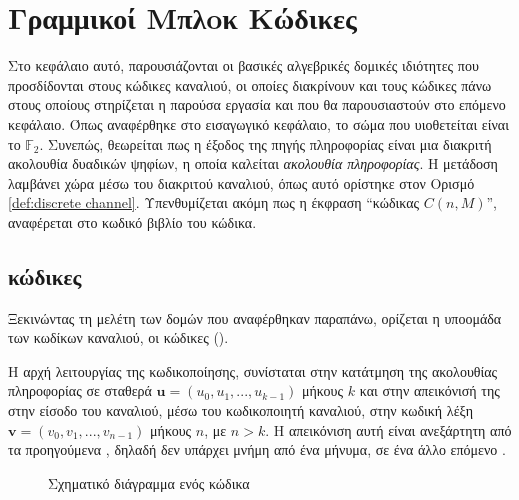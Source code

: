 \chapter{Γραμμικοί Μπλoκ Κώδικες}
Στο κεφάλαιο αυτό, παρουσιάζονται οι βασικές αλγεβρικές δομικές ιδιότητες που προσδίδονται στους κώδικες καναλιού, οι οποίες διακρίνουν και τους κώδικες πάνω στους οποίους στηρίζεται η παρούσα εργασία και που θα παρουσιαστούν στο επόμενο κεφάλαιο. Όπως αναφέρθηκε στο εισαγωγικό κεφάλαιο, το σώμα που υιοθετείται είναι το $\mathbb{F}_2$. Συνεπώς, θεωρείται πως η έξοδος της πηγής πληροφορίας είναι μια διακριτή ακολουθία  δυαδικών ψηφίων, η οποία καλείται \textit{ακολουθία πληροφορίας}. Η μετάδοση λαμβάνει χώρα μέσω του διακριτού καναλιού, όπως αυτό ορίστηκε στον Ορισμό \ref{def:discrete channel}. Υπενθυμίζεται ακόμη πως η έκφραση \enquote{κώδικας $C(n,M)$}, αναφέρεται στο κωδικό βιβλίο του κώδικα.

\section{ κώδικες}
Ξεκινώντας τη μελέτη των δομών που αναφέρθηκαν παραπάνω, ορίζεται η υποομάδα των κωδίκων καναλιού, οι κώδικες \textit{} ().

Η αρχή λειτουργίας της  κωδικοποίησης, συνίσταται στην κατάτμηση της ακολουθίας πληροφορίας σε σταθερά  $\mathbf{u} = (u_0, u_1, ..., u_{k-1})$ μήκους $k$ και στην απεικόνισή της στην είσοδο του καναλιού, μέσω του κωδικοποιητή καναλιού, στην κωδική λέξη $\mathbf{v} = (v_0, v_1, ..., v_{n-1})$ μήκους $n$, με $n>k$. H απεικόνιση αυτή είναι ανεξάρτητη από τα προηγούμενα , δηλαδή δεν υπάρχει μνήμη από ένα  μήνυμα, σε ένα άλλο επόμενο \cite{proakis1994communication}.

\begin{figure}[h]
\caption{Σχηματικό διάγραμμα ενός  κώδικα}
\label{fig:linear block codes}
\end{figure}

